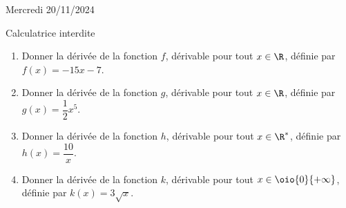 \documentclass[a4paper,11pt,eval]{nsi}
\begin{document}
\textcolor{UGLiBlue}{Mercredi 20/11/2024}\\
\maketitle
\begin{center}
	Calculatrice interdite
\end{center}


\begin{enumerate}[]
    \item Donner la dérivée de la fonction $f$, dérivable pour tout $x\in\R$, définie par  $f(x)=-15x-7$.
    \item Donner la dérivée de la fonction $g$, dérivable pour tout $x\in\R$, définie par  $g(x)=\dfrac{1}{2}x^5$.
    \item Donner la dérivée de la fonction $h$, dérivable pour tout $x\in\R^*$, définie par  $h(x)=\dfrac{10}{x}$.
    \item Donner la dérivée de la fonction $k$, dérivable pour tout $x\in \oio{0}{+\infty}$, définie par $k(x)=3\sqrt{x}$.
\end{enumerate}
\\
\end{document}
